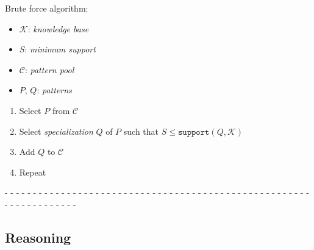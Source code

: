 \documentclass[aspectratio=169]{beamer}
\begin{document}
\begin{frame}






  Brute force algorithm:

  {\small
  \begin{itemize}
  \item $\mathcal{K}$: \emph{knowledge base}
  \item $S$: \emph{minimum support}
  \item $\mathcal{C}$: \emph{pattern pool}
  \item $P$, $Q$: \emph{patterns}
  \end{itemize}
  }
  
  \begin{enumerate}
  \item Select $P$ from $\mathcal{C}$
  \item Select \emph{specialization} $Q$ of $P$ such that $S \leq
    \texttt{support}(Q, \mathcal{K})$
  \item Add $Q$ to $\mathcal{C}$
  \item Repeat
  \end{enumerate}

  - - - - - - - - - - - - - - - - - - - - - - - - - - - - - - - - - -
  - - - - - - - - - - - - - - - - - - - - - - - - - - - - - - - - -\\[0.1cm]

\end{frame}

\subsection{Reasoning}
\end{document}
